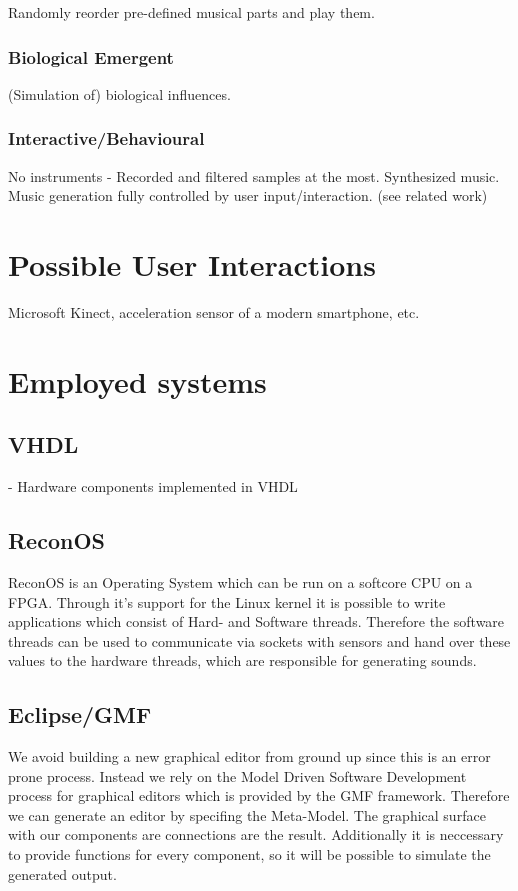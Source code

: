 	Randomly reorder pre-defined musical parts and play them.

	\subsubsection{Biological Emergent}

	(Simulation of) biological influences.

	\subsubsection{Interactive/Behavioural}

	No instruments - Recorded and filtered samples at the most. Synthesized music. Music generation fully controlled by user input/interaction. (see related work)

	\section{Possible User Interactions}
	Microsoft Kinect, acceleration sensor of a modern smartphone, etc.
	  
	\section{Employed systems}
	  \subsection{VHDL}
	    - Hardware components implemented in VHDL
	  \subsection{ReconOS}
		ReconOS is an Operating System which can be run on a softcore CPU on a FPGA. Through it's support for the Linux kernel it is possible to write applications which consist of Hard- and Software threads. Therefore the software threads can be used to communicate via sockets with sensors and hand over these values to the hardware threads, which are responsible for generating sounds.
	  \subsection{Eclipse/GMF}
		We avoid building a new graphical editor from ground up since this is an error prone process. Instead we rely on the Model Driven Software Development process for graphical editors which is provided by the GMF framework. Therefore we can generate an editor by specifing the Meta-Model. The graphical surface with our components are connections are the result. Additionally it is neccessary to provide functions for every component, so it will be possible to simulate the generated output.
	  
      